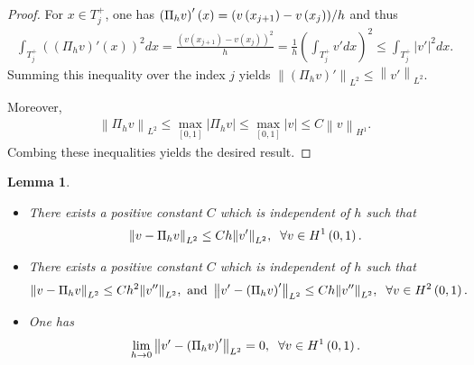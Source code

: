 \documentclass[11pt,a4paper,center,notitlepage]{article}
\numberwithin{equation}{section}
\newtheorem{lemma}{Lemma}[section]
\begin{document}
\begin{proof}
For $x\in T_j^+$, one has $\left( {{\Pi _h}v} \right)'\left( x \right) = {{\left( {v\left( {{x_{j + 1}}} \right) - v\left( {{x_j}} \right)} \right)} \mathord{\left/
 {\vphantom {{\left( {v\left( {{x_{j + 1}}} \right) - v\left( {{x_j}} \right)} \right)} h}} \right.
 \kern-\nulldelimiterspace} h}$ and thus
\begin{align}
\int_{T_j^ + } {{{\left( {\left( {{\Pi _h}v} \right)'\left( x \right)} \right)}^2}dx}  = \frac{{{{\left( {v\left( {{x_{j + 1}}} \right) - v\left( {{x_j}} \right)} \right)}^2}}}{h} = \frac{1}{h}{\left( {\int_{T_j^ + } {v'dx} } \right)^2} \le \int_{T_j^ + } {{{\left| {v'} \right|}^2}dx} .
\end{align}
Summing this inequality over the index $j$ yields ${\left\| {\left( {{\Pi _h}v} \right)'} \right\|_{{L^2}}} \le {\left\| {v'} \right\|_{{L^2}}}$.

Moreover, 
\begin{align}
{\left\| {{\Pi _h}v} \right\|_{{L^2}}} \le \mathop {\max }\limits_{\left[ {0,1} \right]} \left| {{\Pi _h}v} \right| \le \mathop {\max }\limits_{\left[ {0,1} \right]} \left| v \right| \le C{\left\| v \right\|_{{H^1}}}.
\end{align}
Combing these inequalities yields the desired result.
\end{proof}

\begin{lemma}
\begin{itemize}
\item[a)] There exists a positive constant $C$ which is independent of $h$ such that 
\begin{align}
{\left\| {v - {\Pi _h}v} \right\|_{{L^2}}} \le Ch{\left\| {v'} \right\|_{{L^2}}},\hspace{2mm} \forall v \in {H^1}\left( {0,1} \right).
\end{align}
\item[b)] There exists a positive constant $C$ which is independent of $h$ such that
\begin{align}
{\left\| {v - {\Pi _h}v} \right\|_{{L^2}}} \le C{h^2}{\left\| {v''} \right\|_{{L^2}}},\mbox{ and }\left\| {v' - \left( {{\Pi _h}v} \right)'} \right\|_{{L^2}} \le Ch{\left\| {v''} \right\|_{{L^2}}},\hspace{2mm}\forall v \in {H^2}\left( {0,1} \right).
\end{align}
\item[c)] One has 
\begin{align}
\mathop {\lim }\limits_{h \to 0} {\left\| {v' - \left( {{\Pi _h}v} \right)'} \right\|_{{L^2}}} = 0,\hspace{2mm} \forall v \in {H^1}\left( {0,1} \right).
\end{align}
\end{itemize}
\end{lemma}
\end{document}
